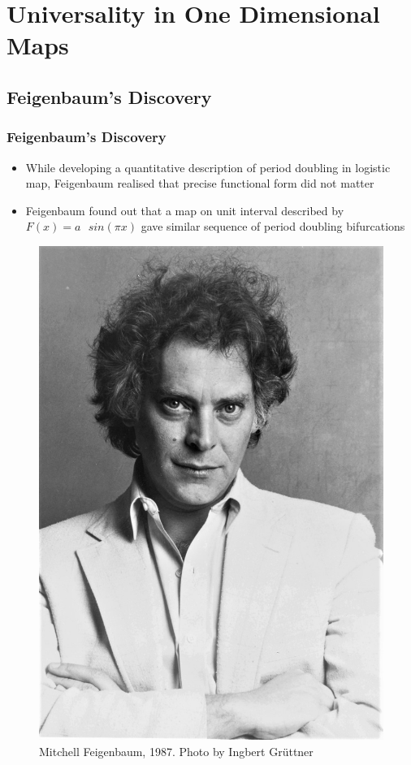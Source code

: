 \documentclass[
	11pt, %
	aspectratio=169, %
]{beamer}
\begin{document}

\section{Universality in One Dimensional Maps}
\subsection{Feigenbaum's Discovery}

\begin{frame}
	\frametitle{Feigenbaum's Discovery}
	
	\begin{itemize}
        \item While developing a quantitative description of period doubling in logistic map, Feigenbaum realised that precise functional form did not matter \pause
        \item Feigenbaum found out that a map on unit interval described by {\color{red}$F(x) = a\text{ }sin(\pi x)$} gave similar sequence of period doubling bifurcations \pause
    \end{itemize}

    \begin{figure}
		\includegraphics[width=0.15\linewidth]{feigenbaum.jpg}
		\caption{Mitchell Feigenbaum, 1987. Photo by Ingbert Grüttner}
	\end{figure}

\end{frame}

\end{document}
